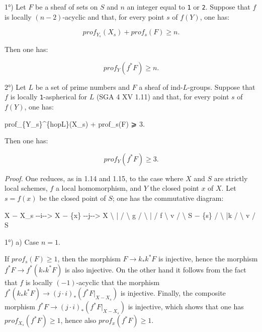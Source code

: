 \documentclass[
]{article}
\newenvironment{Shaded}{}{}
\newcommand{\NormalTok}[1]{#1}
\begin{document}
1°) Let \(F\) be a sheaf of sets on \(S\) and \(n\) an integer equal to
\texttt{1} or \texttt{2}. Suppose that \(f\) is locally
\((n - 2)\)-acyclic and that, for every point \(s\) of \(f(Y)\), one
has:

\[
prof_{Y_{s}}(X_{s}) + prof_{s}(F) \geqslant n.
\]

Then one has:

\[
prof_{Y}(f^{*} F) \geqslant n.
\]

2°) Let \(L\) be a set of prime numbers and \(F\) a sheaf of
ind-\(L\)-groups. Suppose that \(f\) is locally \texttt{1}-aspherical
for \(L\) (SGA 4 XV 1.11) and that, for every point \(s\) of \(f(Y)\),
one has:

\begin{Shaded}
\begin{Highlighting}[]
\NormalTok{prof\_\{Y\_s\}\^{}\{hopL\}(X\_s) + prof\_s(F) ⩾ 3.}
\end{Highlighting}
\end{Shaded}

Then one has:

\[
prof_{Y}(f^{*} F) \geqslant 3.
\]

\emph{Proof.} One reduces, as in 1.14 and 1.15, to the case where \(X\)
and \(S\) are strictly local schemes, \(f\) a local homomorphism, and
\(Y\) the closed point \(x\) of \(X\). Let \(s = f(x)\) be the closed
point of \(S\); one has the commutative diagram:

\begin{Shaded}
\begin{Highlighting}[]
\NormalTok{X − X\_s {-}{-}i{-}{-}\textgreater{} X − \{x\} {-}{-}j{-}{-}\textgreater{} X}
\NormalTok{        \textbackslash{}         |          /}
\NormalTok{         \textbackslash{}        g         /}
\NormalTok{          \textbackslash{}       |        / f}
\NormalTok{           \textbackslash{}      v       /}
\NormalTok{            \textbackslash{}   S − \{s\}  /}
\NormalTok{             \textbackslash{}    |k    /}
\NormalTok{              \textbackslash{}   v    /}
\NormalTok{                  S}
\end{Highlighting}
\end{Shaded}

1°) a) Case \(n = 1\).

If \(prof_{s}(F) \geqslant 1\), then the morphism
\(F \to k_{*} k^{*} F\) is injective, hence the morphism
\(f^{*} F \to f^{*}(k_{*} k^{*} F)\) is also injective. On the other
hand it follows from the fact that \(f\) is locally \((-1)\)-acyclic
that the morphism
\(f^{*}(k_{*} k^{*} F) \to (j \cdot i)_{*}(f^{*} F|_{X - X_{s}})\) is
injective. Finally, the composite morphism
\(f^{*} F \to (j \cdot i)_{*}(f^{*} F|_{X - X_{s}})\) is injective,
which shows that one has \(prof_{X_{s}}(f^{*} F) \geqslant 1\), hence
also \(prof_{x}(f^{*} F) \geqslant 1\).
\end{document}
